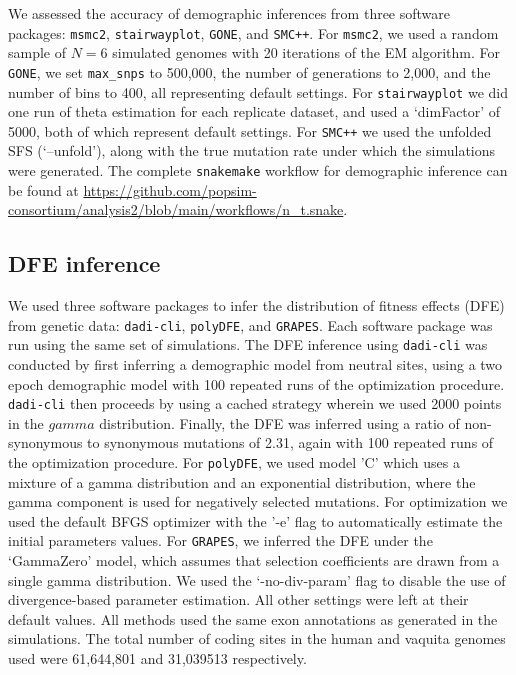 \documentclass[hidelinks]{article}
\newcommand{\snakemake}{\texttt{snakemake}\xspace}
\newcommand{\msmc}{\texttt{msmc2}\xspace}
\newcommand{\stairway}{\texttt{stairwayplot}\xspace}
\newcommand{\gone}{\texttt{GONE}\xspace}
\newcommand{\smcpp}{\texttt{SMC++}\xspace}
\newcommand{\polydfe}{\texttt{polyDFE}\xspace}
\newcommand{\dadicli}{\texttt{dadi-cli}\xspace}
\newcommand{\grapes}{\texttt{GRAPES}\xspace}
\begin{document}
    We assessed the accuracy of demographic inferences from three software packages:
    \msmc \citep{Schiffels2020}, \stairway \citep{liu2020stairway}, \gone \citep{santiago2020recent},
    and \smcpp \citep{terhorst2017robust}.
    For \msmc \citep{Schiffels2020}, we used a random sample of $N=6$ simulated genomes with 20
    iterations of the EM algorithm.
    For \gone \citep{santiago2020recent}, we set \texttt{max\_snps} to 500,000,
    the number of generations to 2,000, and the number of bins to 400, all representing default settings.
    For \stairway \citep{liu2020stairway} we did one run of theta estimation for each replicate dataset,
    and used a `dimFactor' of 5000, both of which represent default settings.
    For \smcpp \citep{terhorst2017robust} we used the unfolded SFS (`--unfold'), 
    along with the true mutation rate under which the simulations were generated. 
    The complete \snakemake workflow for demographic inference can be found at
    \url{https://github.com/popsim-consortium/analysis2/blob/main/workflows/n_t.snake}.
    

    \subsection*{DFE inference}
    We used three software packages to infer the distribution of fitness effects (DFE) from genetic data:
    \dadicli \citep{Huang2023,kim2017inference}, \polydfe \citep{tataru2020polydfe}, and \grapes \citep{galtier2016adaptive}.
    Each software package was run using the same set of simulations.
    The DFE inference using \dadicli was conducted by first inferring a demographic model from neutral sites,
    using a two epoch demographic model with 100 repeated runs of the optimization procedure.
    \dadicli then proceeds by using a cached strategy wherein we used 2000 points in the $gamma$ distribution.
    Finally, the DFE was inferred using a ratio of non-synonymous to synonymous mutations of 2.31, again with 
    100 repeated runs of the optimization procedure.
    For \polydfe, we used model 'C' which uses a mixture of a gamma distribution and an exponential distribution,
    where the gamma component is used for negatively selected mutations. For optimization we used
    the default BFGS optimizer with the '-e' flag to automatically estimate the initial parameters values.
    For \grapes, we inferred the DFE under the `GammaZero' model, which assumes that selection coefficients
    are drawn from a single gamma distribution. We used the `-no-div-param' flag to disable the use
    of divergence-based parameter estimation. All other settings were left at their default values.
    All methods used the same exon annotations as generated in the simulations. The total number of coding sites
    in the human and vaquita genomes used were 61,644,801 and 31,039513 respectively.
\end{document}

